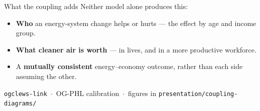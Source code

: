 \documentclass[aspectratio=169,11pt]{beamer}
\begin{document}
\begin{frame}{What the coupling adds}
  Neither model alone produces this:
  \medskip
  \begin{itemize}\setlength\itemsep{7pt}
    \item \textbf{Who} an energy-system change helps or hurts --- the effect by age and income group.
    \item \textbf{What cleaner air is worth} --- in lives, and in a more productive workforce.
    \item A \textbf{mutually consistent} energy--economy outcome, rather than each side assuming the other.
  \end{itemize}
  \vfill
  {\footnotesize\color{mute}\texttt{ogclews-link}\, $\cdot$\, OG-PHL calibration\, $\cdot$\, figures in
  \texttt{presentation/coupling-diagrams/}}
\end{frame}
\end{document}
